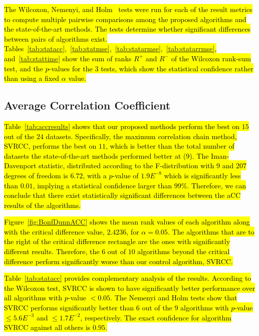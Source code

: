 \documentclass[preprint,12pt]{elsarticle}
\begin{document}
\hl{The Wilcoxon, Nemenyi, and Holm~{\cite{Wilcoxon1945}} tests were run for each of the result metrics to compute multiple pairwise comparisons among the proposed algorithms and the state-of-the-art methods. The tests determine whether significant differences between pairs of algorithms exist. Tables~{\ref{tab:statacc}},~{\ref{tab:statmse}},~{\ref{tab:statarmse}},~{\ref{tab:statarrmse}}, and~{\ref{tab:stattime}} show the sum of ranks $R^+$ and $R^-$ of the Wilcoxon rank-sum test, and the $p$-values for the $3$ tests, which show the statistical confidence rather than using a fixed $\alpha$ value.}

\subsection{Average Correlation Coefficient}\label{subsec:acc}
\hl{Table~{\ref{tab:accresults}} shows that our proposed methods perform the best on $15$ out of the $24$ datasets. Specifically, the maximum correlation chain method, SVRCC, performs the best on $11$, which is better than the total number of datasets the state-of-the-art methods performed better at ($9$). The Iman-Davenport statistic, distributed according to the F-distribution with 9 and 207 degrees of freedom is $6.72$, with a $p$-value of $1.9E^{-8}$ which is significantly less than $0.01$, implying a statistical confidence larger than $99\%$. Therefore, we can conclude that there exist statistically significant differences between the aCC results of the algorithms.}

\hl{Figure~{\ref{fig:BonfDunnACC}} shows the mean rank values of each algorithm along with the critical difference value, $2.4236$, for $\alpha = 0.05$. The algorithms that are to the right of the critical difference rectangle are the ones with significantly different results. Therefore, the $6$ out of $10$ algorithms beyond the critical difference perform significantly worse than our control algorithm, SVRCC.}

\hl{Table~{\ref{tab:statacc}} provides complementary analysis of the results. According to the Wilcoxon test, SVRCC is shown to have significantly better performance over all algorithms with $p$-value $< 0.05$. The Nemenyi and Holm tests show that SVRCC performs significantly better than $6$ out of the $9$ algorithms with $p$-value $\leq 5.6E^{-3}$ and $\leq 1.7E^{-2}$, respectively. The exact confidence for algorithm SVRCC against all others is $0.95$.}
\end{document}
